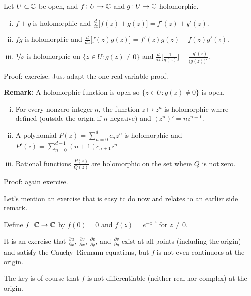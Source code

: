 \documentclass[10pt,aspectratio=169]{beamer}
\begin{document}
\begin{frame}
\begin{proposition}
Let $U \subset {\mathbb{C}}$ be open, and $f \colon U \to {\mathbb{C}}$ and
$g \colon U \to {\mathbb{C}}$ holomorphic.
\pause
\begin{enumerate}[(i)]
\item
$f+g$ is holomorphic and $\frac{d}{dz}\bigl[ f(z)+g(z) \bigr] = f'(z) + g'(z)$.
\pause
\item
$fg$ is holomorphic and $\frac{d}{dz}\bigl[f(z) g(z) \bigr] = f'(z)g(z) + f(z)g'(z)$.
\pause
\item
$\nicefrac{1}{g}$ is holomorphic on $\bigl\{ z \in U : g(z) \not= 0 \bigr\}$ and
$\frac{d}{dz}\bigl[\frac{1}{g(z)}\bigr] = \frac{-g'(z)}{{\bigl(g(z)\bigr)}^2}$.
\end{enumerate}
\end{proposition}

\medskip
\pause

Proof: exercise.  Just adapt the one real variable proof.

\medskip
\pause

\textbf{Remark:} A holomorphic function is open so
$\bigl\{ z \in U : g(z) \not= 0 \bigr\}$ is open.
\end{frame}

\begin{frame}
\begin{proposition}
\begin{enumerate}[(i)]
\pause
\item For every nonzero integer $n$, the function $z \mapsto z^n$ is holomorphic
where defined (outside the origin if $n$ negative) and $(z^n)' = n z^{n-1}$.
\pause
\item
A polynomial $P(z) = \sum_{n=0}^d c_n z^n$ is
holomorphic and
$P'(z) = \sum_{n=0}^{d-1} (n+1) c_{n+1} z^n$.
\pause
\item Rational functions $\frac{P(z)}{Q(z)}$
are holomorphic on the set where $Q$ is not zero.
\end{enumerate}
\end{proposition}

\pause

Proof: again exercise.
\end{frame}

\begin{frame}
Let's mention
an exercise that is easy to do now and relates to an earlier side remark.

\medskip
\pause

Define $f \colon {\mathbb{C}} \to {\mathbb{C}}$ by $f(0)=0$ and
$f(z) = e^{-z^{-4}}$ for $z \not=0$.

\medskip
\pause

It is an exercise that
$\frac{\partial u}{\partial x}$,
$\frac{\partial v}{\partial x}$,
$\frac{\partial u}{\partial y}$, and
$\frac{\partial v}{\partial y}$ exist at all points (including
the origin) and satisfy the Cauchy--Riemann equations,
but $f$ is not even continuous at the origin.

\medskip
\pause

The key is of course that $f$ is not differentiable (neither real nor complex)
at the origin.
\end{frame}
\end{document}
